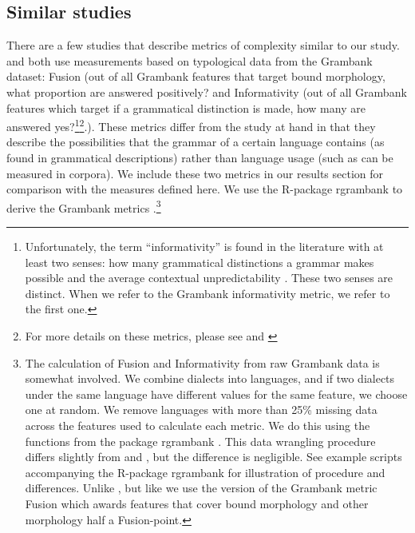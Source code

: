 \documentclass[USenglish]{article}
\begin{document}
\subsection{Similar studies}
There are a few studies that describe metrics of complexity similar to our study. 
\cite{grambank_release} and \citet{shcherbakova2023societies} both use measurements based on typological data from the Grambank dataset: Fusion (out of all Grambank features that target bound morphology, what proportion are answered positively? and Informativity (out of all Grambank features which target if a grammatical distinction is made, how many are answered yes?\footnote{Unfortunately, the term ``informativity'' is found in the literature with at least two senses: how many grammatical distinctions a grammar makes possible \citep{shcherbakova2023societies, grambank_release} and the average contextual unpredictability \citet{cohen2008phone}. These two senses are distinct. When we refer to the Grambank informativity metric, we refer to the first one.}\footnote{For more details on these metrics, please see \citet{grambank_release} and \citet{R-rgrambank}}.). These metrics differ from the study at hand in that they describe the possibilities that the grammar of a certain language contains (as found in grammatical descriptions) rather than language usage (such as can be measured in corpora). 
We include these two metrics in our results section for comparison with the measures defined here. 
We use the R-package rgrambank to derive the Grambank metrics \citep{R-rgrambank}.\footnote{The calculation of Fusion and Informativity from raw Grambank data is somewhat involved. We combine dialects into languages, and if two dialects under the same language have different values for the same feature, we choose one at random. 
We remove languages with more than 25\% missing data across the features used to calculate each metric. 
We do this using the functions from the package rgrambank \citep{R-rgrambank}. 
This data wrangling procedure differs slightly from \citet{grambank_release} and \citet{shcherbakova2023societies}, but the difference is negligible. 
See example scripts accompanying the R-package rgrambank for illustration of procedure and differences. Unlike \cite{shcherbakova2023societies}, but like \cite{grambank_release} we use the version of the Grambank metric Fusion which awards features that cover bound morphology and other morphology half a Fusion-point.} 
\end{document}
